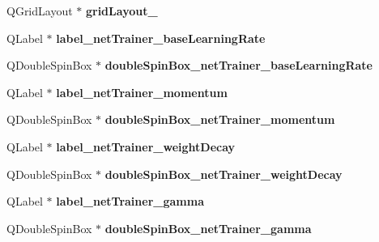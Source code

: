 \begin{DoxyCompactItemize}
\item 
\mbox{\label{class_ui___main_window_a8731b71c513ff94baf59614807823c5d}} 
Q\+Grid\+Layout $\ast$ {\bfseries grid\+Layout\+\_}
\item 
\mbox{\label{class_ui___main_window_ae65ee3642413e13cca8522fb4adb36bd}} 
Q\+Label $\ast$ {\bfseries label\+\_\+net\+Trainer\+\_\+base\+Learning\+Rate}
\item 
\mbox{\label{class_ui___main_window_a42892cc2689c2d11206914f6addf89f1}} 
Q\+Double\+Spin\+Box $\ast$ {\bfseries double\+Spin\+Box\+\_\+net\+Trainer\+\_\+base\+Learning\+Rate}
\item 
\mbox{\label{class_ui___main_window_a2a0e0f940ce23dd72ab5b6cbf4d86fc9}} 
Q\+Label $\ast$ {\bfseries label\+\_\+net\+Trainer\+\_\+momentum}
\item 
\mbox{\label{class_ui___main_window_a7368d21bf059ec743664b3c68b2a478f}} 
Q\+Double\+Spin\+Box $\ast$ {\bfseries double\+Spin\+Box\+\_\+net\+Trainer\+\_\+momentum}
\item 
\mbox{\label{class_ui___main_window_a4d6ce2aae903425008ecff282a6c3dcc}} 
Q\+Label $\ast$ {\bfseries label\+\_\+net\+Trainer\+\_\+weight\+Decay}
\item 
\mbox{\label{class_ui___main_window_ad0af2fc3d0402d5db46cdeb5ecbf4e74}} 
Q\+Double\+Spin\+Box $\ast$ {\bfseries double\+Spin\+Box\+\_\+net\+Trainer\+\_\+weight\+Decay}
\item 
\mbox{\label{class_ui___main_window_adf8200f11c0809ef1037b99f054435f0}} 
Q\+Label $\ast$ {\bfseries label\+\_\+net\+Trainer\+\_\+gamma}
\item 
\mbox{\label{class_ui___main_window_ab68156111202136d63001dc7767b8529}} 
Q\+Double\+Spin\+Box $\ast$ {\bfseries double\+Spin\+Box\+\_\+net\+Trainer\+\_\+gamma}
\item 
\mbox{\label{class_ui___main_window_a69ddaadbf2546e3b364c23d2039e7b19}} 

\end{DoxyCompactItemize}
